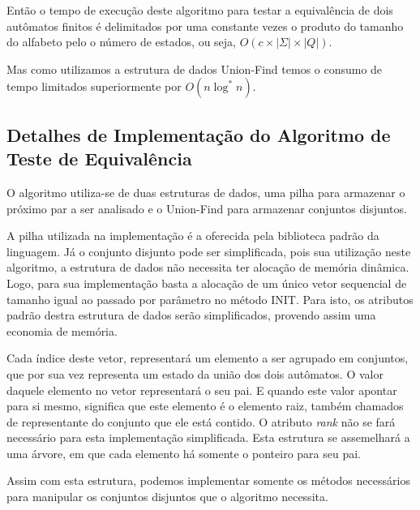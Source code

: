\documentclass[
	12pt,				%
	openany,
	oneside,
	a4paper,			%
	english,			%
	brazil				%
	]{abntex2}
\begin{document}
 Então o tempo de execução deste algoritmo para testar a equivalência de dois autômatos finitos é delimitados por uma constante vezes o produto do tamanho do alfabeto pelo o número de estados, ou seja, $O(c \times |\Sigma| \times |Q|)$.

 Mas como utilizamos a estrutura de dados Union-Find temos o consumo de tempo limitados superiormente por $O(n \log^* n)$.



\subsection {Detalhes de Implementação do Algoritmo de Teste de Equivalência} %

  O algoritmo utiliza-se de duas estruturas de dados, uma pilha para armazenar o próximo par a ser analisado e o Union-Find para armazenar conjuntos disjuntos.

  A pilha utilizada na implementação é a oferecida pela biblioteca padrão da linguagem. Já o conjunto disjunto pode ser simplificada, pois sua utilização neste algoritmo, a estrutura de dados não necessita ter alocação de memória dinâmica. Logo, para sua implementação basta a alocação de um único vetor sequencial de tamanho igual ao passado por parâmetro no método INIT. Para isto, os atributos padrão destra estrutura de dados serão simplificados, provendo assim uma economia de memória.

  Cada índice deste vetor, representará um elemento a ser agrupado em conjuntos, que por sua vez representa um estado da união dos dois autômatos. O valor daquele elemento no vetor representará o seu pai. E quando este valor apontar para si mesmo, significa que este elemento é o elemento raiz, também chamados de representante do conjunto que ele está contido. O atributo \textit{rank} não se fará necessário para esta implementação simplificada. Esta estrutura se assemelhará a uma árvore, em que cada elemento há somente o ponteiro para seu pai.

  Assim com esta estrutura, podemos implementar somente os métodos necessários para manipular os conjuntos disjuntos que o algoritmo necessita.
\end{document}
